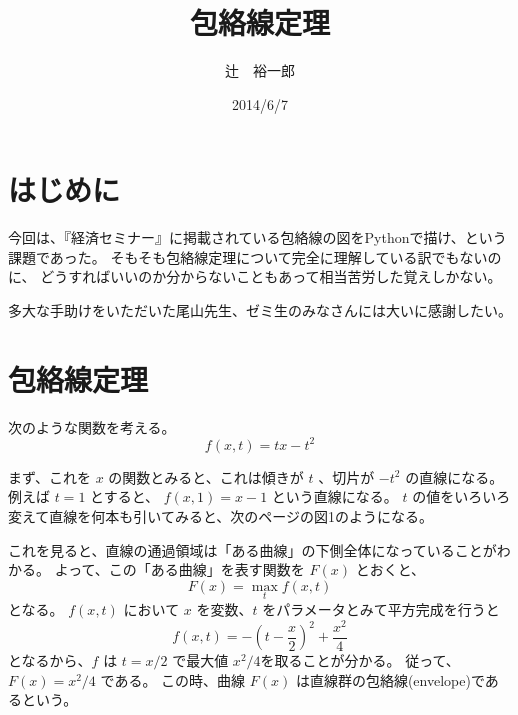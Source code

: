 \documentclass[11pt,a4j,fleqn]{jarticle}
\title{包絡線定理}
\author{辻　裕一郎}
\date{2014/6/7}
\begin{document}
\maketitle

\section{はじめに}
今回は、『経済セミナー』に掲載されている包絡線の図をPythonで描け、という課題であった。
そもそも包絡線定理について完全に理解している訳でもないのに、
どうすればいいのか分からないこともあって相当苦労した覚えしかない。

多大な手助けをいただいた尾山先生、ゼミ生のみなさんには大いに感謝したい。

\section{包絡線定理}

次のような関数を考える。
\begin{equation}
f(x, t) =  tx -t^2 
\end{equation}

まず、これを $x$ の関数とみると、これは傾きが $t$ 、切片が $-t^2$ の直線になる。
例えば $t = 1$ とすると、 $f(x, 1) = x - 1 $ という直線になる。
$t$ の値をいろいろ変えて直線を何本も引いてみると、次のページの図1のようになる。

これを見ると、直線の通過領域は「ある曲線」の下側全体になっていることがわかる。
よって、この「ある曲線」を表す関数を $ F (x) $ とおくと、
\begin{equation}
F(x) = \max_{t} {f(x , t)}
\end{equation}
となる。
$f(x, t)$ において $x$ を変数、$t$ をパラメータとみて平方完成を行うと
\begin{equation}
 f(x, t) = -\left(t - \frac{x}{2}\right)^2 + \frac{x^2}{4} 
\end{equation}
となるから、$f$ は $ t = x / 2 $ で最大値 $ x^2 / 4 $を取ることが分かる。
従って、 $F(x) = x^2/4$ である。 この時、曲線 $F(x)$ は直線群の包絡線(envelope)であるという。

\newpage
\end{document}
